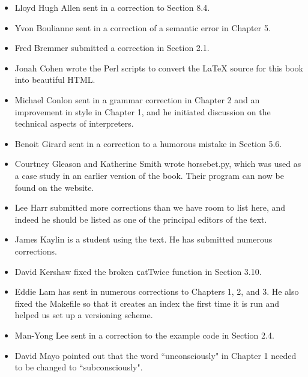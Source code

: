 \documentclass[
DIV=11,
fontsize=12,
twoside,
headinclude=false,
titlepage=firstiscover,
abstract=true,
headsepline=true,
footsepline=true,
chapterprefix=true, %
headings=big,
bibliography=totoc,%
captions=tableheading
]{scrbook}
\theoremstyle{definition}
\begin{document}
\begin{itemize}

\small
\item Lloyd Hugh Allen sent in a correction to Section 8.4.

\item Yvon Boulianne sent in a correction of a semantic error in
Chapter 5.

\item Fred Bremmer submitted a correction in Section 2.1.

\item Jonah Cohen wrote the Perl scripts to convert the
LaTeX source for this book into beautiful HTML.

\item Michael Conlon sent in a grammar correction in Chapter 2
and an improvement in style in Chapter 1, and he initiated discussion
on the technical aspects of interpreters.

\item Benoit Girard sent in a
correction to a humorous mistake in Section 5.6.

\item Courtney Gleason and Katherine Smith wrote {\texttt horsebet.py},
which was used as a case study in an earlier version of the book.  Their
program can now be found on the website.

\item Lee Harr submitted more corrections than we have room to list
here, and indeed he should be listed as one of the principal editors
of the text.

\item James Kaylin is a student using the text. He has submitted
numerous corrections.

\item David Kershaw fixed the broken {\texttt catTwice} function in Section
3.10.

\item Eddie Lam has sent in numerous corrections to Chapters 
1, 2, and 3.
He also fixed the Makefile so that it creates an index the first time it is
run and helped us set up a versioning scheme.  

\item Man-Yong Lee sent in a correction to the example code in
Section 2.4.  

\item David Mayo pointed out that the word ``unconsciously"
in Chapter 1 needed
to be changed to ``subconsciously".


\end{itemize}
\end{document}
